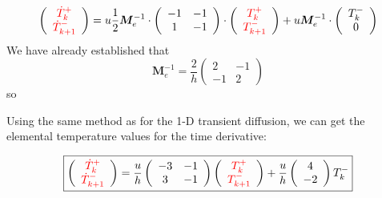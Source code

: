 \begin{eqnarray}
\left(
\begin{array}{cc}
{\color{red}\dot T_k^+}  \\
{\color{red} \dot T_{k+1}^-} 
\end{array}
\right) 
=
u\frac{1}{2}  
{\bm M}_e^{-1} \cdot
\left(\begin{array}{cc}
-1 & -1 \\
1 & -1 
\end{array}\right)
 \cdot 
\left( \begin{array}{cc}
{\color{red}T_k^+}  \\
{\color{red}T_{k+1}^-} 
\end{array} \right) 
+u 
{\bm M}_e^{-1} \cdot
\left( \begin{array}{cc}
{T_{k}^-}   \\  0 
\end{array} \right)
\end{eqnarray}
We have already established that 
\[
{\bm M}_e^{-1} = 
\frac{2}{h}
\left( 
\begin{array}{cc}
2 & -1 \\
-1 & 2
\end{array}
\right)
\]
so 






 Using the same method as for the 1-D transient diffusion, we can get the elemental 
temperature values for the time derivative:
 
 
\begin{eqnarray}
\boxed{
\left(
\begin{array}{cc}
{\color{red}\dot T_k^+}  \\
{\color{red} \dot T_{k+1}^-} 
\end{array}
\right)=
\frac{u}{h} 
\left(\begin{array}{cc}
    -3 & -1 \\
     3 & -1
\end{array}
\right)
\left(
\begin{array}{cc}
{\color{red}T_k^+}  \\
{\color{red}T_{k+1}^-} 
\end{array}
\right) + \frac{u}{h} \left(
\begin{array}{cc}
4   \\
-2 
\end{array}
\right)T_k^-  
}
\end{eqnarray}

